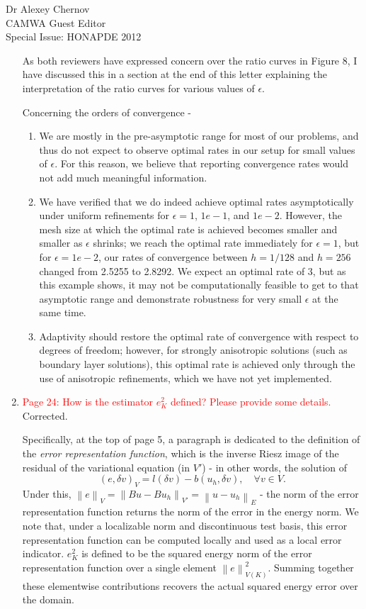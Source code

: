 \documentclass{letter}
\newcommand{\nor}[1]{\left\| #1 \right\|}
\begin{document}
\begin{letter}{Dr Alexey Chernov\\CAMWA Guest Editor\\Special Issue: HONAPDE 2012}
\begin{enumerate}
As both reviewers have expressed concern over the ratio curves in Figure 8, I have discussed this in a section at the end of this letter explaining the interpretation of the ratio curves for various values of $\epsilon$.  

Concerning the orders of convergence - 
\begin{enumerate}
\item We are mostly in the pre-asymptotic range for most of our problems, and thus do not expect to observe optimal rates in our setup for small values of $\epsilon$.  For this reason, we believe that reporting convergence rates would not add much meaningful information.  
\item We have verified that we do indeed achieve optimal rates asymptotically under uniform refinements for $\epsilon = 1$, $1e-1$, and $1e-2$.  However, the mesh size at which the optimal rate is achieved becomes smaller and smaller as $\epsilon$ shrinks; we reach the optimal rate immediately for $\epsilon = 1$, but for $\epsilon = 1e-2$, our rates of convergence between $h = 1/128$ and $h = 256$ changed from 2.5255 to 2.8292.  We expect an optimal rate of $3$, but as this example shows, it may not be computationally feasible to get to that asymptotic range and demonstrate robustness for very small $\epsilon$ at the same time.  
\item Adaptivity should restore the optimal rate of convergence with respect to degrees of freedom; however, for strongly anisotropic solutions (such as boundary layer solutions), this optimal rate is achieved only through the use of anisotropic refinements, which we have not yet implemented.  
\end{enumerate}

\item \textcolor{red}{Page 24: How is the estimator $e_K^2$ defined? Please provide some details.}  Corrected.  

Specifically, at the top of page 5, a paragraph is dedicated to the definition of the \textit{error representation function}, which is the inverse Riesz image of the residual of the variational equation (in $V'$) - in other words, the solution of
\[
(e,\delta v)_V = l(\delta v) - b(u_h,\delta v), \quad \forall v\in V.
\]
Under this, $\nor{e}_V = \nor{Bu-Bu_h}_{V'} = \nor{u-u_h}_E$ - the norm of the error representation function returns the norm of the error in the energy norm.  We note that, under a localizable norm and discontinuous test basis, this error representation function can be computed locally and used as a local error indicator.  $e_K^2$ is defined to be the squared energy norm of the error representation function over a single element $\nor{e}_{V(K)}^2$.  Summing together these elementwise contributions recovers the actual squared energy error over the domain.


\end{enumerate}
\end{letter}
\end{document}
